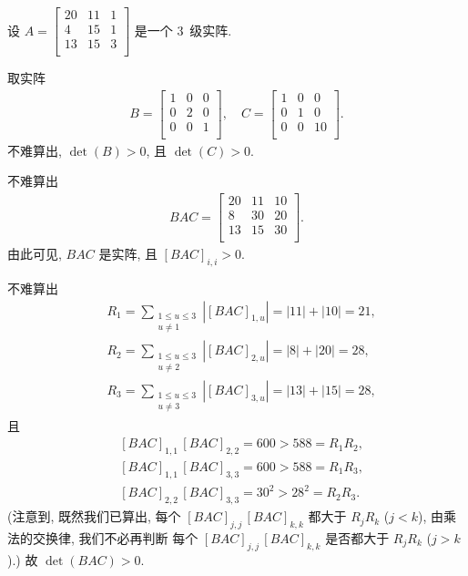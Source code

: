 \begin{example}[continues=emp:NonzeroDet2]
    设 \(A =
    \begin{bmatrix}
        20 & 11 & 1 \\
        4  & 15 & 1 \\
        13 & 15 & 3 \\
    \end{bmatrix}\)
    是一个 \(3\)~级实阵.

    取实阵
    \begin{align*}
        B = \begin{bmatrix}
                1 & 0 & 0 \\
                0 & 2 & 0 \\
                0 & 0 & 1 \\
            \end{bmatrix},
        \quad
        C = \begin{bmatrix}
                1 & 0 & 0  \\
                0 & 1 & 0  \\
                0 & 0 & 10 \\
            \end{bmatrix}.
    \end{align*}
    不难算出, \(\det {(B)} > 0\),
    且 \(\det {(C)} > 0\).

    不难算出
    \begin{align*}
        BAC = \begin{bmatrix}
                  20 & 11 & 10 \\
                  8  & 30 & 20 \\
                  13 & 15 & 30 \\
              \end{bmatrix}.
    \end{align*}
    由此可见, \(BAC\) 是实阵, 且 \([BAC]_{i,i} > 0\).

    不难算出
    \begin{align*}
         & R_1 = \sum_{\substack{1 \leq u \leq 3 \\u \neq 1}}
        {|[BAC]_{1,u}|} = |11| + |10| = 21,      \\
         & R_2 = \sum_{\substack{1 \leq u \leq 3 \\u \neq 2}}
        {|[BAC]_{2,u}|} = |8| + |20| = 28,       \\
         & R_3 = \sum_{\substack{1 \leq u \leq 3 \\u \neq 3}}
        {|[BAC]_{3,u}|} = |13| + |15| = 28,
    \end{align*}
    且
    \begin{align*}
         & [BAC]_{1,1}\,[BAC]_{2,2}
        = 600 > 588 = R_1 R_2,      \\
         & [BAC]_{1,1}\,[BAC]_{3,3}
        = 600 > 588 = R_1 R_3,      \\
         & [BAC]_{2,2}\,[BAC]_{3,3}
        = 30^2 > 28^2 = R_2 R_3.
    \end{align*}
    (注意到, 既然我们已算出,
    每个 \([BAC]_{j,j}\,[BAC]_{k,k}\)
    都大于 \(R_j R_k\)
    (\(j < k\)),
    由乘法的交换律,
    我们不必再判断%
    每个 \([BAC]_{j,j}\,[BAC]_{k,k}\)
    是否都大于 \(R_j R_k\)
    (\(j > k\)).)
    故 \(\det {(BAC)} > 0\).


\end{example}
